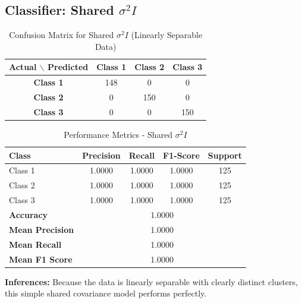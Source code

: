 \subsection{Classifier: Shared $\sigma^2 I$}


\begin{table}[H]
\centering
\caption{Confusion Matrix for Shared $\sigma^2 I$ (Linearly Separable Data)}
\label{tab:confmat_LS_sigma2I}
\begin{tabular}{|c|c|c|c|}
\hline
\textbf{Actual $\backslash$ Predicted} & \textbf{Class 1} & \textbf{Class 2} & \textbf{Class 3} \\
\hline
\textbf{Class 1} & 148 & 0   & 0   \\
\textbf{Class 2} & 0  & 150 & 0   \\
\textbf{Class 3} & 0   & 0   & 150 \\
\hline
\end{tabular}
\end{table}


\begin{table}[H]
\centering
\caption{Performance Metrics - Shared $\sigma^2 I$}
\begin{tabular}{lcccc}
\toprule
\textbf{Class} & \textbf{Precision} & \textbf{Recall} & \textbf{F1-Score} & \textbf{Support} \\
\midrule
Class 1 & 1.0000 & 1.0000 & 1.0000 & 125 \\
Class 2 & 1.0000 & 1.0000 & 1.0000 & 125 \\
Class 3 & 1.0000 & 1.0000 & 1.0000 & 125 \\
\midrule
\textbf{Accuracy} & \multicolumn{4}{c}{1.0000} \\
\textbf{Mean Precision} & \multicolumn{4}{c}{1.0000} \\
\textbf{Mean Recall} & \multicolumn{4}{c}{1.0000} \\
\textbf{Mean F1 Score} & \multicolumn{4}{c}{1.0000} \\
\bottomrule
\end{tabular}
\end{table}

\textbf{Inferences:} Because the data is linearly separable with clearly distinct clusters, this simple shared covariance model performs perfectly.

